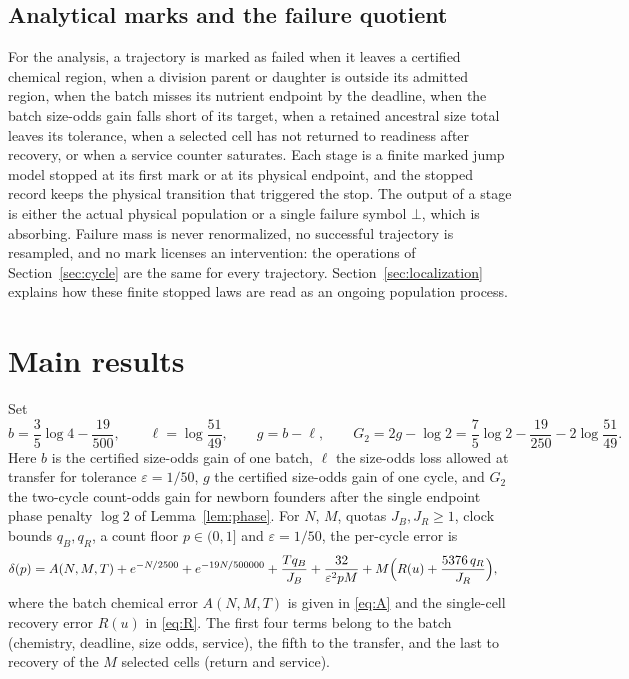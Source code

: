 \documentclass[11pt,a4paper]{article}
\theoremstyle{plain}
\theoremstyle{definition}
\theoremstyle{remark}
\newcommand{\eps}{\varepsilon}
\newcommand{\fail}{\bot}
\begin{document}
\subsection{Analytical marks and the failure quotient}\label{sec:marks}
For the analysis, a trajectory is marked as failed when it leaves a certified chemical region, when a division parent or daughter is outside its admitted region, when the batch misses its nutrient endpoint by the deadline, when the batch size-odds gain falls short of its target, when a retained ancestral size total leaves its tolerance, when a selected cell has not returned to readiness after recovery, or when a service counter saturates. Each stage is a finite marked jump model stopped at its first mark or at its physical endpoint, and the stopped record keeps the physical transition that triggered the stop. The output of a stage is either the actual physical population or a single failure symbol $\fail$, which is absorbing. Failure mass is never renormalized, no successful trajectory is resampled, and no mark licenses an intervention: the operations of Section~\ref{sec:cycle} are the same for every trajectory. Section~\ref{sec:localization} explains how these finite stopped laws are read as an ongoing population process.

\section{Main results}\label{sec:main}

Set
\begin{equation}\label{eq:gain}
b=\frac35\log4-\frac{19}{500},\qquad \ell=\log\frac{51}{49},\qquad g=b-\ell,\qquad G_2=2g-\log2=\frac75\log2-\frac{19}{250}-2\log\frac{51}{49}.
\end{equation}
Here $b$ is the certified size-odds gain of one batch, $\ell$ the size-odds loss allowed at transfer for tolerance $\eps=1/50$, $g$ the certified size-odds gain of one cycle, and $G_2$ the two-cycle count-odds gain for newborn founders after the single endpoint phase penalty $\log2$ of Lemma~\ref{lem:phase}. For $N$, $M$, quotas $J_B,J_R\ge1$, clock bounds $q_B,q_R$, a count floor $p\in(0,1]$ and $\eps=1/50$, the per-cycle error is
\begin{align}\label{eq:delta}
\delta(p)={}&A(N,M,T)+e^{-N/2500}+e^{-19N/500000}+\frac{Tq_B}{J_B}
 +\frac{32}{\eps^2pM}+M\Bigl(R(u)+\frac{5376\,q_R}{J_R}\Bigr),
\end{align}
where the batch chemical error $A(N,M,T)$ is given in \eqref{eq:A} and the single-cell recovery error $R(u)$ in \eqref{eq:R}. The first four terms belong to the batch (chemistry, deadline, size odds, service), the fifth to the transfer, and the last to recovery of the $M$ selected cells (return and service).
\end{document}
